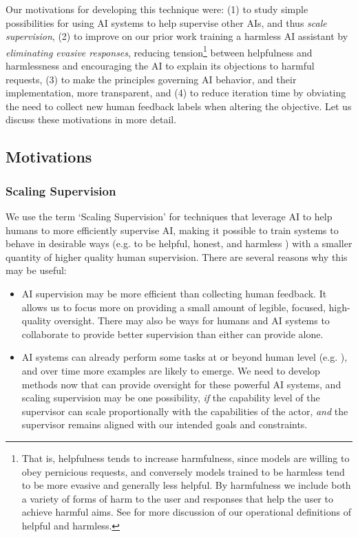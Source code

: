 Our motivations for developing this technique were: (1) to study simple possibilities for using AI systems to help supervise other AIs, and thus \emph{scale supervision},  (2) to improve on our prior work training a harmless AI assistant by \emph{eliminating evasive responses}, reducing tension\footnote{That is, helpfulness tends to increase harmfulness, since models are willing to obey pernicious requests, and conversely models trained to be harmless tend to be more evasive and generally less helpful.  By harmfulness we include both a variety of forms of harm to the user and responses that help the user to achieve harmful aims.  See \cite{bai2022training, DeepRedTeaming} for more discussion of our operational definitions of helpful and harmless.  } \cite{bai2022training, SparrowDM}  between helpfulness and harmlessness and encouraging the AI to explain its objections to harmful requests,  (3) to make the principles governing AI behavior, and their implementation, more transparent, and (4) to reduce  iteration time  by obviating the need to collect new human feedback labels when altering the objective. Let us discuss these motivations in more detail.

\subsection{Motivations}

\subsubsection*{Scaling Supervision}

We use the term `Scaling Supervision' for techniques that leverage AI to help humans to more efficiently supervise AI, making it possible to train systems to behave in desirable ways (e.g. to be helpful, honest, and harmless \cite{askell2021general}) with a smaller quantity of higher quality human supervision.  There are several reasons why this may be useful:

\begin{itemize}
    \item AI supervision may be more efficient than collecting human feedback. It allows us to focus more on providing a small amount of legible, focused, high-quality oversight. There may also be ways for humans and AI systems to collaborate \cite{BowmanSandwiching} to provide better supervision than either can provide alone.
    \item AI systems can already perform some tasks at or beyond human level (e.g. \cite{silver2017mastering}), and over time more examples are likely to emerge.  We need to develop methods now that can provide oversight for these powerful AI systems, and scaling supervision may be one possibility, \emph{if} the capability level of the supervisor can scale proportionally with the capabilities of the actor, \emph{and} the supervisor remains aligned with our intended goals and constraints.
\end{itemize}

